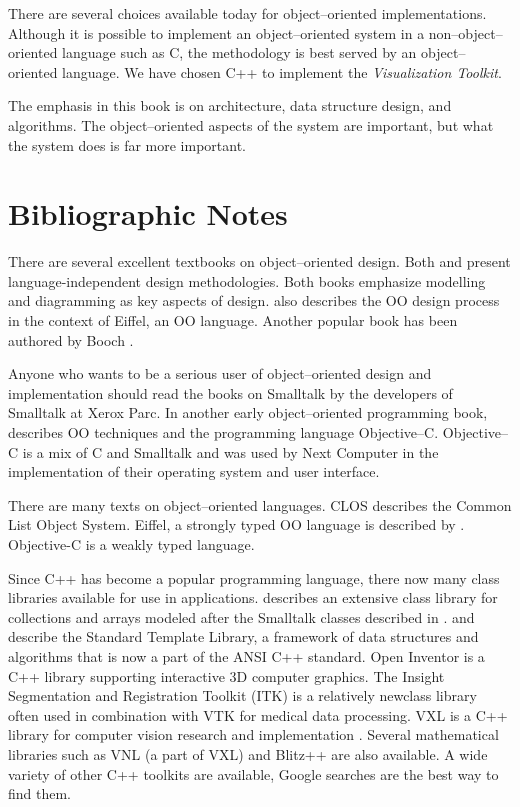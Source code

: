 There are several choices available today for object--oriented implementations. Although it is possible to implement an object--oriented system in a non--object--oriented language such as C, the methodology is best served by an object--oriented language. We have chosen C++ to implement the \emph{Visualization Toolkit}.

The emphasis in this book is on architecture, data structure design, and algorithms. The object--oriented aspects of the system are important, but what the system does is far more important.

\section{Bibliographic Notes}
There are several excellent textbooks on object--oriented design.
Both \cite{Rumbaugh91} and \cite{Birtwistle79} present language-independent design methodologies.
Both books emphasize modelling and diagramming as key aspects of design.
\cite{Meyer88} also describes the OO design process in the context of Eiffel, an OO language.
Another popular book has been authored by Booch \cite{Booch91}.

Anyone who wants to be a serious user of object--oriented design and implementation should read the books on Smalltalk \cite{Goldberg83} \cite{Goldberg84} by the developers of Smalltalk at Xerox Parc.
In another early object--oriented programming book, \cite{Cox86} describes OO techniques and the programming language Objective--C.
Objective--C is a mix of C and Smalltalk and was used by Next Computer in the implementation of their operating system and user interface.

There are many texts on object--oriented languages. CLOS \cite{Keene89} describes the Common List Object System. Eiffel, a strongly typed OO language is described by \cite{Meyer88} .
Objective-C \cite{Cox86} is a weakly typed language.

Since C++ has become a popular programming language, there now many class libraries available for use in applications.
\cite{Gorlen90} describes an extensive class library for collections and arrays modeled after the Smalltalk classes described in \cite{Goldberg83} .
\cite{Stepanov94} and \cite{Musser94} describe the Standard Template Library, a framework of data structures and algorithms that is now a part of the ANSI C++ standard. Open Inventor \cite{Inventor} is a C++ library supporting interactive 3D computer graphics.
The Insight Segmentation and Registration Toolkit (ITK) is a relatively newclass library often used in combination with VTK \cite{ITK} for medical data processing. VXL is a C++ library for computer vision research and implementation \cite{VXL}.
Several mathematical libraries such as VNL (a part of VXL) and Blitz++ \cite{Blitz} are also available. A wide variety of other C++ toolkits are available, Google searches \cite{Google} are the best way to find them.


